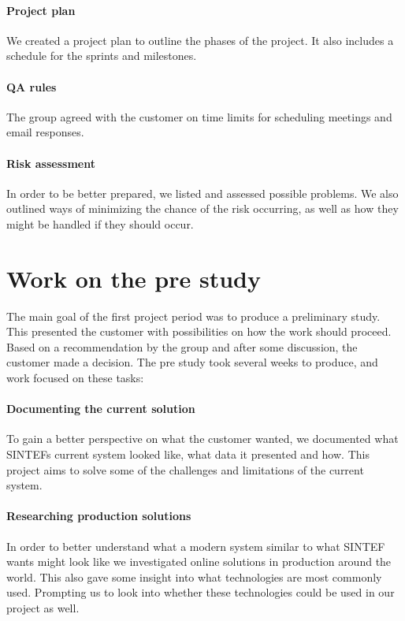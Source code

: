 \documentclass[11pt,a4paper,titlepage,oneside]{report}
\begin{document}
\paragraph{Project plan}
We created a project plan to outline the phases of the project. It also includes a schedule for the sprints and milestones.
	
\paragraph{QA rules}
The group agreed with the customer on time limits for scheduling meetings and email responses.

\paragraph{Risk assessment}
In order to be better prepared, we listed and assessed possible problems. We also outlined ways of minimizing the chance of the risk occurring, as well as how they might be handled if they should occur.

\section{Work on the pre study}
The main goal of the first project period was to produce a preliminary study. This presented the customer with possibilities on how the work should proceed. Based on a recommendation by the group and after some discussion, the customer made a decision. The pre study took several weeks to produce, and work focused on these tasks:

\paragraph{Documenting the current solution}
To gain a better perspective on what the customer wanted, we documented what SINTEFs current system looked like, what data it presented and how. This project aims to solve some of the challenges and limitations of the current system.

\paragraph{Researching production solutions}
In order to better understand what a modern system similar to what SINTEF wants might look like we investigated online solutions in production around the world. This also gave some insight into what technologies are most commonly used. Prompting us to look into whether these technologies could be used in our project as well.
\end{document}
